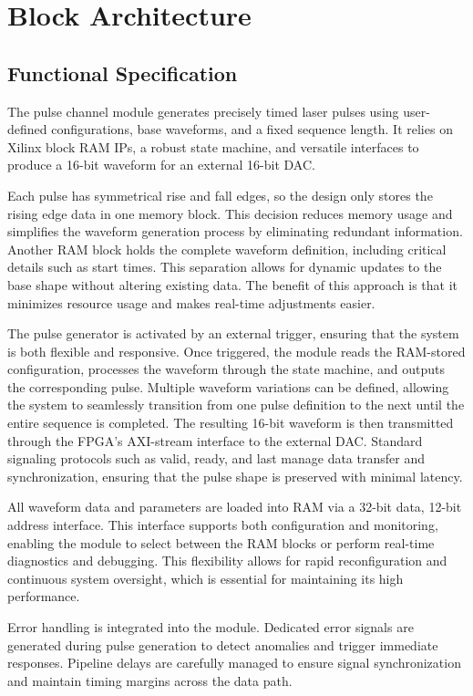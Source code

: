 \chapter{Block Architecture}
\section{Functional Specification}

The pulse channel module generates precisely timed laser pulses using user-defined configurations, base waveforms, and a fixed sequence length. It relies on Xilinx block RAM IPs, a robust state machine, and versatile interfaces to produce a 16-bit waveform for an external 16-bit DAC.

Each pulse has symmetrical rise and fall edges, so the design only stores the rising edge data in one memory block. This decision reduces memory usage and simplifies the waveform generation process by eliminating redundant information. Another RAM block holds the complete waveform definition, including critical details such as start times. This separation allows for dynamic updates to the base shape without altering existing data. The benefit of this approach is that it minimizes resource usage and makes real-time adjustments easier.

The pulse generator is activated by an external trigger, ensuring that the system is both flexible and responsive. Once triggered, the module reads the RAM-stored configuration, processes the waveform through the state machine, and outputs the corresponding pulse. Multiple waveform variations can be defined, allowing the system to seamlessly transition from one pulse definition to the next until the entire sequence is completed. The resulting 16-bit waveform is then transmitted through the FPGA's AXI-stream interface to the external DAC. Standard signaling protocols such as valid, ready, and last manage data transfer and synchronization, ensuring that the pulse shape is preserved with minimal latency.

All waveform data and parameters are loaded into RAM via a 32-bit data, 12-bit address interface. This interface supports both configuration and monitoring, enabling the module to select between the RAM blocks or perform real-time diagnostics and debugging. This flexibility allows for rapid reconfiguration and continuous system oversight, which is essential for maintaining its high performance.

Error handling is integrated into the module. Dedicated error signals are generated during pulse generation to detect anomalies and trigger immediate responses. Pipeline delays are carefully managed to ensure signal synchronization and maintain timing margins across the data path.

